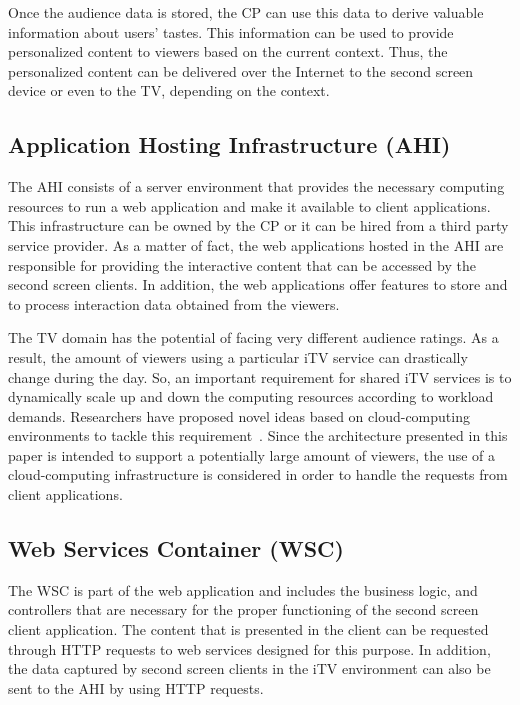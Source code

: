 \documentclass[journal]{IEEEtran}
\begin{document}
Once the audience data is stored, the CP can use this data to derive valuable information about users' tastes. This information can be used to provide personalized content to viewers based on the current context. Thus, the personalized content can be delivered over the Internet to the second screen device or even to the TV, depending on the context.

\subsection{Application Hosting Infrastructure (AHI)}

The AHI consists of a server environment that provides the necessary computing resources to run a web application and make it available to client applications. This infrastructure can be owned by the CP or it can be hired from a third party service provider. As a matter of fact, the web applications hosted in the AHI are responsible for providing the interactive content that can be accessed by the second screen clients. In addition, the web applications offer features to store and to process interaction data obtained from the viewers.

The TV domain has the potential of facing very different audience ratings. As a result, the amount of viewers using a particular iTV service can drastically change during the day. So, an important requirement for shared iTV services is to dynamically scale up and down the computing resources according to workload demands. Researchers have proposed novel ideas based on cloud-computing environments to tackle this requirement~\cite{Lee2010,Lai2011}. Since the architecture presented in this paper is intended to support a potentially large amount of viewers, the use of a cloud-computing infrastructure is considered in order to handle the requests from client applications.

\subsection{Web Services Container (WSC)}
\label{ssub_web_application}

The WSC is part of the web application and includes the business logic, and controllers that are necessary for the proper functioning of the second screen client application. The content that is presented in the client can be requested through HTTP requests to web services designed for this purpose. In addition, the data captured by second screen clients in the iTV environment can also be sent to the AHI by using HTTP requests. 
\end{document}
